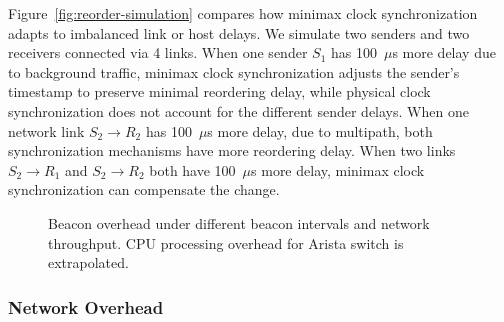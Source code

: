 Figure~\ref{fig:reorder-simulation} compares how minimax clock synchronization adapts to imbalanced link or host delays.
We simulate two senders and two receivers connected via 4 links.
When one sender $S_1$ has 100~$\mu$s more delay due to background traffic, minimax clock synchronization adjusts the sender's timestamp to preserve minimal reordering delay, while physical clock synchronization does not account for the different sender delays.
When one network link $S_2 \rightarrow R_2$ has 100~$\mu$s more delay, due to multipath, both synchronization mechanisms have more reordering delay.
When two links $S_2 \rightarrow R_1$ and $S_2 \rightarrow R_2$ both have 100~$\mu$s more delay, minimax clock synchronization can compensate the change.



\begin{figure}[t]
\centering
	\hspace{0.01\textwidth}
	\caption{
		Beacon overhead under different beacon intervals and network throughput.
		CPU processing overhead for Arista switch is extrapolated.
	}
\label{fig:overhead}
\end{figure}




\subsubsection{Network Overhead}
\label{sec:eval-overhead}


